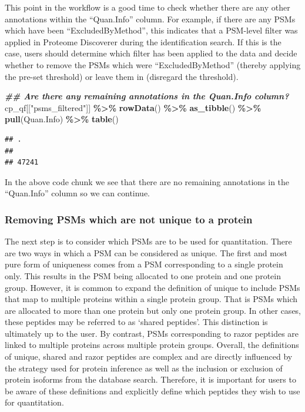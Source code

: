\documentclass[9pt,a4paper,]{extarticle}
\newenvironment{Shaded}{\begin{snugshade}}{\end{snugshade}}
\newcommand{\DocumentationTok}[1]{\textcolor[rgb]{0.56,0.35,0.01}{\textbf{\textit{#1}}}}
\newcommand{\FunctionTok}[1]{\textcolor[rgb]{0.13,0.29,0.53}{\textbf{#1}}}
\newcommand{\NormalTok}[1]{#1}
\newcommand{\SpecialCharTok}[1]{\textcolor[rgb]{0.81,0.36,0.00}{\textbf{#1}}}
\newcommand{\StringTok}[1]{\textcolor[rgb]{0.31,0.60,0.02}{#1}}
\begin{document}
This point in the workflow is a good time to check whether there are any other
annotations within the ``Quan.Info'' column. For example, if there are any PSMs
which have been ``ExcludedByMethod'', this indicates that a PSM-level filter was
applied in Proteome Discoverer during the identification search. If this is the
case, users should determine which filter has been applied to the data and
decide whether to remove the PSMs which were ``ExcludedByMethod'' (thereby applying
the pre-set threshold) or leave them in (disregard the threshold).

\begin{Shaded}
\begin{Highlighting}[]
\DocumentationTok{\#\# Are there any remaining annotations in the Quan.Info column?}
\NormalTok{cp\_qf[[}\StringTok{"psms\_filtered"}\NormalTok{]] }\SpecialCharTok{\%\textgreater{}\%} 
  \FunctionTok{rowData}\NormalTok{() }\SpecialCharTok{\%\textgreater{}\%} 
  \FunctionTok{as\_tibble}\NormalTok{() }\SpecialCharTok{\%\textgreater{}\%} 
  \FunctionTok{pull}\NormalTok{(Quan.Info) }\SpecialCharTok{\%\textgreater{}\%} 
  \FunctionTok{table}\NormalTok{()}
\end{Highlighting}
\end{Shaded}

\begin{verbatim}
## .
##       
## 47241
\end{verbatim}

In the above code chunk we see that there are no remaining annotations in the
``Quan.Info'' column so we can continue.

\subsubsection{Removing PSMs which are not unique to a protein}\label{removing-psms-which-are-not-unique-to-a-protein}

The next step is to consider which PSMs are to be used for quantitation. There
are two ways in which a PSM can be considered as unique. The first and most pure
form of uniqueness comes from a PSM corresponding to a single protein only. This
results in the PSM being allocated to one protein and one protein group.
However, it is common to expand the definition of unique to include PSMs that
map to multiple proteins within a single protein group. That is PSMs which are
allocated to more than one protein but only one protein group. In other cases,
these peptides may be referred to as `shared peptides'. This distinction
is ultimately up to the user. By contrast, PSMs corresponding to razor peptides
are linked to multiple proteins across multiple protein groups. Overall, the
definitions of unique, shared and razor peptides are complex and are directly
influenced by the strategy used for protein inference as well as the inclusion or
exclusion of protein isoforms from the database search. Therefore, it is important
for users to be aware of these definitions and explicitly define which peptides
they wish to use for quantitation.
\end{document}
